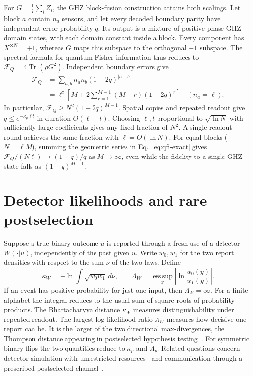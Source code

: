 \documentclass[aps,prl,twocolumn,superscriptaddress,longbibliography,reprint,floatfix]{revtex4-2}
\newcommand{\tr}{\operatorname{Tr}}
\newcommand{\FQ}{\mathcal F_Q}
\begin{document}
For $G=\frac12\sum_i Z_i$, the GHZ block-fusion construction attains both scalings. Let block $a$
contain $n_a$ sensors, and let every decoded boundary parity have
independent error probability $q$. Its output is a mixture of positive-phase
GHZ domain states, with each domain constant inside a block. Every component
has $X^{\otimes N}=+1$, whereas $G$ maps this subspace to the orthogonal
$-1$ subspace. The spectral formula for quantum Fisher information thus
reduces to $\FQ=4\tr(\rho G^2)$. Independent boundary errors give
\begin{align}
 \FQ
 &=\sum_{a,b}n_an_b(1-2q)^{|a-b|}
 \nonumber\\
 &=\ell^2\left[M+2\sum_{r=1}^{M-1}(M-r)(1-2q)^r\right]
 \quad (n_a=\ell).
 \label{eq:qfi-exact}
\end{align}
In particular, $\FQ\ge N^2(1-2q)^{M-1}$.
Spatial copies and repeated readout give
$q\le e^{-\kappa_p\ell t}$ in duration $O(\ell+t)$.
Choosing $\ell,t$ proportional to $\sqrt{\ln N}$ with sufficiently
large coefficients gives any fixed fraction of $N^2$. A single
readout round achieves the same fraction with $\ell=O(\ln N)$.
For equal blocks ($N=\ell M$), summing the geometric series in
Eq.~\eqref{eq:qfi-exact} gives $\FQ/(N\ell)\to(1-q)/q$ as
$M\to\infty$, even while the fidelity to a single GHZ state falls
as $(1-q)^{M-1}$.

\FloatBarrier
\section{Detector likelihoods and rare postselection}
\label{sm:detector}

Suppose a true binary outcome $u$ is reported through a fresh use of a
detector $W(\cdot|u)$, independently of the past given $u$. Write $w_0,w_1$
for the two report densities with respect to the sum $\nu$ of the two laws. Define
\begin{equation}
 \kappa_W=-\ln\int\sqrt{w_0w_1}\,d\nu,\qquad
 \Lambda_W=\operatorname*{ess\,sup}_{y}
 \left|\ln\frac{w_0(y)}{w_1(y)}\right|.
 \label{eq:detector-likelihoods}
\end{equation}
If an event has positive probability for just one input, then $\Lambda_W=\infty$.
For a finite alphabet the integral reduces to the usual sum of square roots
of probability products. The Bhattacharyya distance $\kappa_W$ measures
distinguishability under repeated readout. The largest log-likelihood
ratio $\Lambda_W$ measures how decisive one report can be. It is the
larger of the two directional max-divergences, the Thompson distance
appearing in postselected hypothesis testing~\cite{Regula2024}.
For symmetric binary flips the two quantities reduce to $\kappa_p$ and
$\Lambda_p$. Related questions concern detector simulation with unrestricted
resources~\cite{Byrne2026} and communication through a prescribed
postselected channel~\cite{Ji2024}.
\end{document}
